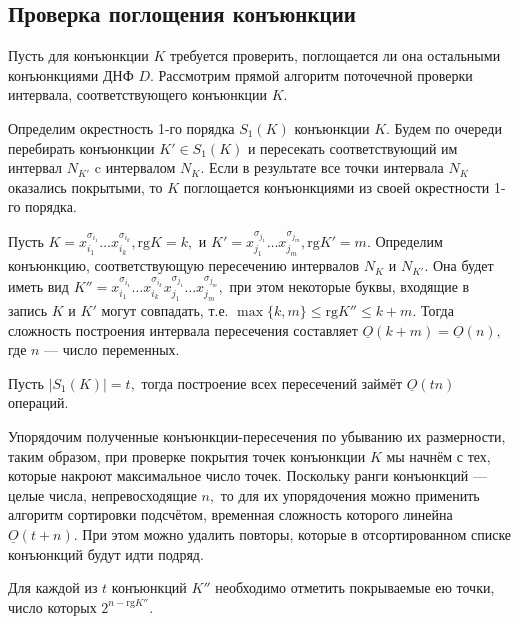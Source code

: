 \documentclass[12pt,a4paper,oneside,fleqn,leqno]{article}
\theoremstyle{definition}
\begin{document}
		\subsection{Проверка поглощения конъюнкции}
			Пусть для конъюнкции $K$ требуется проверить, поглощается ли она остальными конъюнкциями ДНФ $D.$ Рассмотрим прямой алгоритм поточечной проверки интервала, соответствующего конъюнкции $K.$\par
			Определим окрестность 1-го порядка $S_1(K)$ конъюнкции $K.$ Будем по очереди перебирать конъюнкции $K' \in S_1(K)$ и пересекать соответствующий им интервал $N_{K'}$ c интервалом $N_K.$ Если в результате все точки интервала $N_K$ оказались покрытыми, то $K$ поглощается конъюнкциями из своей окрестности 1-го порядка.\par
			Пусть $K = x_{i_1}^{\sigma_{i_1}} \ldots x_{i_k}^{\sigma_{i_k}}, \text{rg}K = k,$ и $K' = x_{j_1}^{\sigma_{j_1}} \ldots x_{j_m}^{\sigma_{j_m}}, \text{rg}K' = m.$ Определим конъюнкцию, соответствующую пересечению интервалов $N_K$ и $N_{K'}.$ Она будет иметь вид $K'' = x_{i_1}^{\sigma_{i_1}} \ldots x_{i_k}^{\sigma_{i_k}} x_{j_1}^{\sigma_{j_1}} \ldots x_{j_m}^{\sigma_{j_m}},$ при этом некоторые буквы, входящие в запись $K$ и $K'$ могут совпадать, т.е. $\max\{k, m\} \leqslant \text{rg}K'' \leqslant k + m.$ Тогда сложность построения интервала пересечения составляет $\underline{O}(k + m) = \underline{O}(n),$ где $n$ --- число переменных.\par
			Пусть $|S_1(K)| = t,$ тогда построение всех пересечений займёт $\underline{O}(tn)$ операций.\par
			Упорядочим полученные конъюнкции-пересечения по убыванию их размерности, таким образом, при проверке покрытия точек конъюнкции $K$ мы начнём с тех, которые накроют максимальное число точек. Поскольку ранги конъюнкций --- целые числа, непревосходящие $n,$ то для их упорядочения можно применить алгоритм сортировки подсчётом, временная сложность которого линейна $\underline{O}(t + n).$ При этом можно удалить повторы, которые в отсортированном списке конъюнкций будут идти подряд.\par
			Для каждой из $t$ конъюнкций $K''$ необходимо отметить покрываемые ею точки, число которых $2^{n - \text{rg}K''}.$\par
\end{document}
